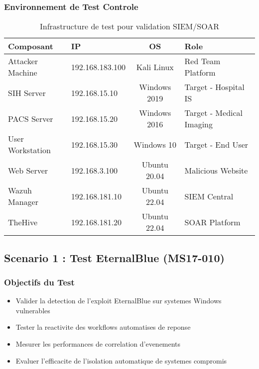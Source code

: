 \subsubsection{Environnement de Test Controle}

\begin{table}[H]
    \centering
    \caption{Infrastructure de test pour validation SIEM/SOAR}
    \begin{tabular}{|l|l|c|l|}
        \hline
        \textbf{Composant} & \textbf{IP}     & \textbf{OS}  & \textbf{Role}            \\
        \hline
        Attacker Machine   & 192.168.183.100 & Kali Linux   & Red Team Platform        \\
        \hline
        SIH Server         & 192.168.15.10   & Windows 2019 & Target - Hospital IS     \\
        \hline
        PACS Server        & 192.168.15.20   & Windows 2016 & Target - Medical Imaging \\
        \hline
        User Workstation   & 192.168.15.30   & Windows 10   & Target - End User        \\
        \hline
        Web Server         & 192.168.3.100   & Ubuntu 20.04 & Malicious Website        \\
        \hline
        Wazuh Manager      & 192.168.181.10  & Ubuntu 22.04 & SIEM Central             \\
        \hline
        TheHive            & 192.168.181.20  & Ubuntu 22.04 & SOAR Platform            \\
        \hline
    \end{tabular}
\end{table}

\subsection{Scenario 1 : Test EternalBlue (MS17-010)}

\subsubsection{Objectifs du Test}

\begin{itemize}
    \item Valider la detection de l'exploit EternalBlue sur systemes Windows vulnerables
    \item Tester la reactivite des workflows automatises de reponse
    \item Mesurer les performances de correlation d'evenements
    \item Evaluer l'efficacite de l'isolation automatique de systemes compromis
\end{itemize}

